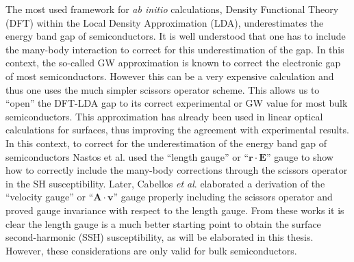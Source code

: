 The most used framework for \emph{ab initio} calculations, Density Functional
Theory (DFT) within the Local Density Approximation (LDA),
\cite{kohnPR65} underestimates the energy band gap of semiconductors. It is well
understood that one has to include the many-body interaction to correct for this
underestimation of the gap. In this context, the so-called GW
approximation\cite{onidaRMP02} is known to correct the electronic gap of most
semiconductors\cite{luceroJPCM12}. However this can be a very expensive
calculation and thus one uses the much simpler scissors operator scheme.
\cite{levinePRL89,levinePRL91,delsolePRB93} This allows us to ``open'' the
DFT-LDA gap to its correct experimental or GW value for most bulk
semiconductors. This approximation has already been used in linear optical
calculations for surfaces,\cite{kippPRL96} thus improving the agreement with
experimental results. In this context, to correct for the underestimation of the
energy band gap of semiconductors Nastos et al.\cite{nastosPRB05} used the
``length gauge'' or ``$\mathbf{r}\cdot\mathbf{E}$'' gauge to show how to
correctly include the many-body corrections through the scissors operator in the
SH susceptibility. Later, Cabellos \textit{et al}.\cite{cabellosPRB09}
elaborated a derivation of the ``velocity gauge'' or
``$\mathbf{A}\cdot\mathbf{v}$'' gauge properly including the scissors operator
and proved gauge invariance with respect to the length gauge. From these works
it is clear the length gauge is a much better starting point to obtain the
surface second-harmonic (SSH) susceptibility, as will be elaborated in this
thesis. However, these considerations are only valid for bulk semiconductors.

